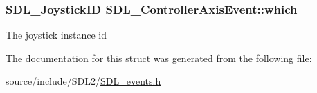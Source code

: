 \subsubsection[{which}]{\setlength{\rightskip}{0pt plus 5cm}S\+D\+L\+\_\+\+Joystick\+I\+D S\+D\+L\+\_\+\+Controller\+Axis\+Event\+::which}\label{struct_s_d_l___controller_axis_event_a07087f68ea9d64b50047d65312ee7b94}
The joystick instance id 

The documentation for this struct was generated from the following file\+:\begin{DoxyCompactItemize}
\item 
source/include/\+S\+D\+L2/\hyperlink{_s_d_l__events_8h}{S\+D\+L\+\_\+events.\+h}\end{DoxyCompactItemize}
